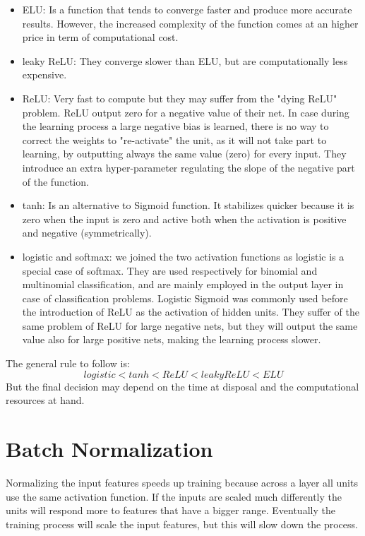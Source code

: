 \documentclass[a4paper]{article}
\begin{document}
\begin{itemize}
\item ELU: Is a function that tends to converge faster and produce more accurate results. However, the increased complexity of the function comes at an higher price in term of computational cost. 
\item leaky ReLU: They converge slower than ELU, but are computationally less expensive.
\item ReLU: Very fast to compute but they may suffer from the "dying ReLU" problem. ReLU output zero for a negative value of their net. In case during the learning process a large negative bias is learned, there is no way to correct the weights to "re-activate" the unit, as it will not take part to learning, by outputting always the same value (zero) for every input. They introduce an extra hyper-parameter regulating the slope of the negative part of the function.
\item tanh: Is an alternative to Sigmoid function. It stabilizes quicker because it is zero when the input is zero and active both when the activation is positive and negative (symmetrically).
\item logistic and softmax: we joined the two activation functions as logistic is a special case of softmax. They are used respectively for binomial and multinomial classification, and are mainly employed in the output layer in case of classification problems. Logistic Sigmoid was commonly used before the introduction of ReLU as the activation of hidden units. They suffer of the same problem of ReLU for large negative nets, but they will output the same value also for large positive nets, making the learning process slower. 
\end{itemize}

The general rule to follow is:
\begin{equation}
    logistic < tanh < ReLU < leaky ReLU  < ELU
\end{equation}
But the final decision may depend on the time at disposal and the computational resources at hand.


\section{Batch Normalization}
Normalizing the input features speeds up training because across a layer all units use the same activation function. If the inputs are scaled much differently the units will respond more to features that have a bigger range. Eventually the training process will scale the input features, but this will slow down the process.
\end{document}

